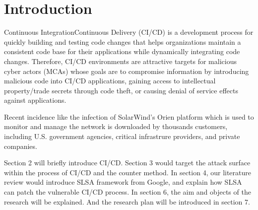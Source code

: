\section{Introduction}
Continuous Integration\/Continuous Delivery (CI/CD) is a development
process for quickly building and testing code changes that helps 
organizations maintain a consistent code base for their applications 
while dynamically integrating code changes. Therefore, CI/CD environments 
are attractive targets for malicious cyber actors (MCAs) whose goals are 
to compromise information by introducing malicious code into CI/CD 
applications, gaining access to intellectual property/trade secrets 
through code theft, or causing denial of service effects against applications.

Recent incidence like the infection of SolarWind's Orien platform \cite{ladisa2023sok, peisert2021perspectives} 
which is used to monitor and manage the network is downloaded by thousands customers, 
including U.S. government agencies, critical infrastrure providers, and private companies. 
 
Section 2 will briefly introduce CI/CD. Section 3 would target the attack
surface within the process of CI/CD and the counter method. In section 4, our literature 
review would introduce SLSA framework from Google, and explain how SLSA can patch 
the vulnerable CI/CD process. In section 6, the aim and objects of the research 
will be explained. And the research plan will be introduced in section 7. 



